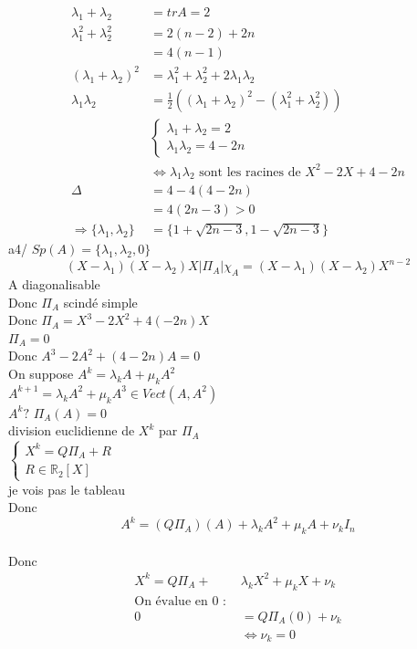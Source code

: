 \documentclass{article}
\begin{document}
\begin{align*}
    \lambda_1 + \lambda_2 &= trA = 2 \\
    \lambda_1^2 + \lambda_2^2 &= 2(n-2) + 2n \\
    &= 4(n-1)\\
    (\lambda_1 + \lambda_2)^2 &= \lambda_1^2 + \lambda_2^2 + 2\lambda_1 \lambda_2\\
    \lambda_1 \lambda_2 &= \frac{1}{2}((\lambda_1 + \lambda_2)^2 - (\lambda_1^2 + \lambda_2^2))\\
    &\begin{cases}
        \lambda_1 + \lambda_2 = 2\\
        \lambda_1 \lambda_2 = 4-2n
    \end{cases}\\
    &\Leftrightarrow \lambda_1 \lambda_2 \text{ sont les racines de } X^2 - 2X + 4 - 2n\\
    \Delta &= 4 - 4(4-2n)\\
    &= 4(2n-3)>0\\
  \Rightarrow \{\lambda_1, \lambda_2\} &= \{1 + \sqrt{2n-3}, 1-\sqrt{2n-3}\}
\end{align*}
a4/ \(Sp(A) = \{\lambda_1, \lambda_2, 0\}\)\\
\begin{equation*}
    (X-\lambda_1)(X-\lambda_2)X \big| \Pi_A \big| \chi_A = (X-\lambda_1)(X-\lambda_2)X^{n-2}
\end{equation*}
A diagonalisable\\
Donc \(\Pi_A\) scindé simple\\
Donc \(\Pi_A = X^3 - 2X^2 + 4(-2n)X\)\\
\(\Pi_A = 0\)\\
Donc \(A^3 - 2A^2 + (4-2n)A = 0\)\\
On suppose \(A^k = \lambda_k A + \mu_k A^2\)\\
\(A^{k+1} = \lambda_k A^2 + \mu_k A^3 \in Vect(A, A^2)\) \\

\noindent 
\(A^k ?\)
\(\Pi_A (A) = 0\)\\
division euclidienne de \(X^k\) par \(\Pi_A\)\\
\(\begin{cases}
    X^k = Q\Pi_A + R \\
    R \in \mathbb{R}_2[X]
\end{cases}\)\\
je vois pas le tableau\\
Donc \begin{equation*}
    A^k = (Q\Pi_A)(A) + \lambda_k A^2 + \mu_k A + \nu_k I_n
\end{equation*}\\
Donc \begin{align*}
    X^k = Q\Pi_A + &\lambda_k X^2 + \mu_k X + \nu_k \\ 
    \text{On évalue en 0 : }\\
    0 &= Q\Pi_A(0) + \nu_k\\
    &\Leftrightarrow \nu_k = 0
\end{align*}
\end{document}
